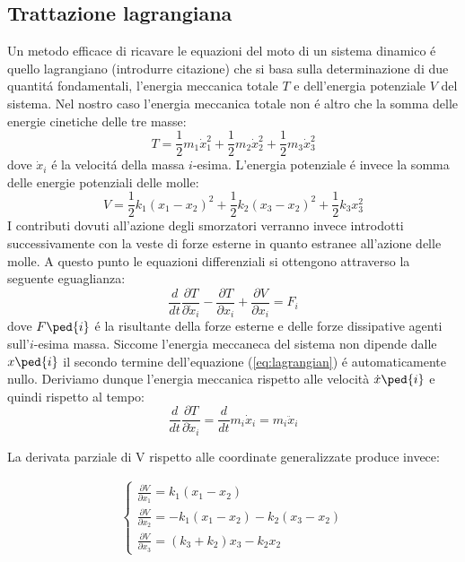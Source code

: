 \documentclass[12pt,a4paper]{article}
\begin{document}
 	\subsection[Lagrangiana]{Trattazione lagrangiana}
 		Un metodo efficace di ricavare le equazioni del moto di un sistema dinamico \'e quello lagrangiano (introdurre citazione) che si basa sulla determinazione di due quantit\'a fondamentali, l'energia meccanica totale $T$ e dell'energia potenziale $V$ del sistema. Nel nostro caso l'energia meccanica totale non \'e altro che la somma delle energie cinetiche delle tre masse:
 		\begin{equation}
 			T= \frac{1}{2} m_1 \dot x_1^2 +\frac{1}{2} m_2 \dot x_2^2+ \frac{1}{2}m_3 \dot x_3^2 
 			\label{eq:mechanical-energy}
 		\end{equation}
 		dove $\dot x_i$ \'e la velocit\'a della massa $i$-esima.
 		L'energia potenziale \'e invece la somma delle energie potenziali delle molle:
 		\begin{equation}
 			V= \frac{1}{2} k_1(x_1-x_2)^2+\frac{1}{2} k_2(x_3-x_2)^2 + \frac{1}{2} k_3 x_3^2
 			\label{eq:potential-energy}
 		\end{equation}
 		I contributi dovuti all'azione degli smorzatori verranno invece introdotti successivamente con la veste di forze esterne in quanto estranee all'azione delle molle.
 		A questo punto le equazioni differenziali si ottengono attraverso la seguente eguaglianza: 		
 		\begin{equation}
 			\frac{d}{dt} \frac{\partial T}{\partial \dot x_i} - \frac{\partial T}{\partial x_i} + \frac{\partial V}{\partial x_i}=F_i
 			\label{eq:lagrangian}
 		\end{equation}
 		dove $F\ped{i}$ \'e la risultante della forze esterne e delle forze dissipative agenti sull'$i$-esima massa. Siccome l'energia meccaneca del sistema non dipende dalle $x\ped{i}$ il secondo termine dell'equazione (\ref{eq:lagrangian}) \'e automaticamente nullo. Deriviamo dunque l'energia meccanica rispetto alle velocità $\dot x\ped{i}$ e quindi rispetto al tempo:
 		\begin{equation}
 			\frac{d}{dt} \frac{\partial T}{\partial \dot x_i}= \frac{d}{dt} m_i \dot{x}_i =m_i \ddot{x}_i
 			\label{eq:energie}
 		\end{equation}
 		
		La derivata parziale di V rispetto alle coordinate generalizzate produce invece:
		
		\begin{gather}
 		\begin{cases}
 		\frac{\partial V}{\partial x_1}= k_1(x_1 - x_2)
 		\\
 		\frac{\partial V}{\partial x_2} = - k_1(x_1 - x_2) - k_2(x_3 - x_2)
 		\\
 		\frac{\partial V}{\partial x_3} = (k_3 +k_2)x_3-k_2 x_2
 		\label{eq:potenziali}
		\end{cases}
		\end{gather}
		
\end{document}
